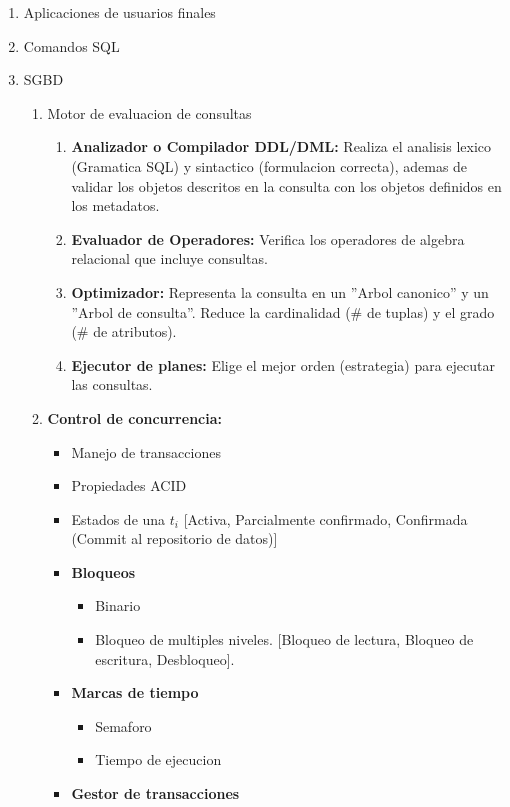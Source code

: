 \documentclass[twoside]{article}
\begin{document}
\begin{enumerate}
  \item Aplicaciones de usuarios finales
  \item Comandos SQL
  \item SGBD
  \begin{enumerate}
    \item Motor de evaluacion de consultas
    \begin{enumerate}
      \item \textbf{Analizador o Compilador DDL/DML:} Realiza el analisis lexico (Gramatica SQL) y sintactico (formulacion correcta), ademas de validar los objetos descritos en la consulta con los objetos definidos en los metadatos.
      \item \textbf{Evaluador de Operadores:} Verifica los operadores de algebra relacional que incluye consultas.
      \item \textbf{Optimizador:} Representa la consulta en un ''Arbol canonico'' y un ''Arbol de consulta''. Reduce la cardinalidad (# de tuplas) y el grado (# de atributos).
      \item \textbf{Ejecutor de planes:} Elige el mejor orden (estrategia) para ejecutar las consultas.
    \end{enumerate}
    \item \textbf{Control de concurrencia:}
    \begin{itemize}
      \item Manejo de transacciones
      \item Propiedades ACID
      \item Estados de una $t_i$ [Activa, Parcialmente confirmado, Confirmada (Commit al repositorio de datos)]
      \item \textbf{Bloqueos}
      \begin{itemize}
        \item Binario
        \item Bloqueo de multiples niveles. [Bloqueo de lectura, Bloqueo de escritura, Desbloqueo].
      \end{itemize}
      \item \textbf{Marcas de tiempo}
      \begin{itemize}
        \item Semaforo
        \item Tiempo de ejecucion
      \end{itemize}
    \item \textbf{Gestor de transacciones}
    \begin{itemize}

\end{itemize}
\end{itemize}
\end{enumerate}
\end{enumerate}
\end{document}
